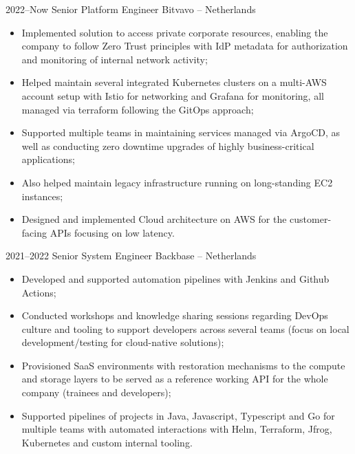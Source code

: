 \documentclass[a4paper]{cv-friggeri-x}
\begin{document}
\begin{entrylist}


\entry
    {2022--Now}
    {Senior Platform Engineer}
    {Bitvavo -- Netherlands}
    {\begin{itemize}
        \item Implemented solution to access private corporate resources, enabling the company to follow Zero Trust principles with IdP metadata for authorization and monitoring of internal network activity;
        \item Helped maintain several integrated Kubernetes clusters on a multi-AWS account setup with Istio for networking and Grafana for monitoring, all managed via terraform following the GitOps approach;
        \item Supported multiple teams in maintaining services managed via ArgoCD, as well as conducting zero downtime upgrades of highly business-critical applications;
        \item Also helped maintain legacy infrastructure running on long-standing EC2 instances;
        \item Designed and implemented Cloud architecture on AWS for the customer-facing APIs focusing on low latency.
    \end{itemize}}

\entry
    {2021--2022}
    {Senior System Engineer}
    {Backbase -- Netherlands}
    {\begin{itemize}
        \item Developed and supported automation pipelines with Jenkins and Github Actions;
        \item Conducted workshops and knowledge sharing sessions regarding DevOps culture and tooling to support developers across several teams (focus on local development/testing for cloud-native solutions);
        \item Provisioned SaaS environments with restoration mechanisms to the compute and storage layers to be served as a reference working API for the whole company (trainees and developers);
        \item Supported pipelines of projects in Java, Javascript, Typescript and Go for multiple teams with automated interactions with Helm, Terraform, Jfrog, Kubernetes and custom internal tooling.
    \end{itemize}}


\end{entrylist}
\end{document}
